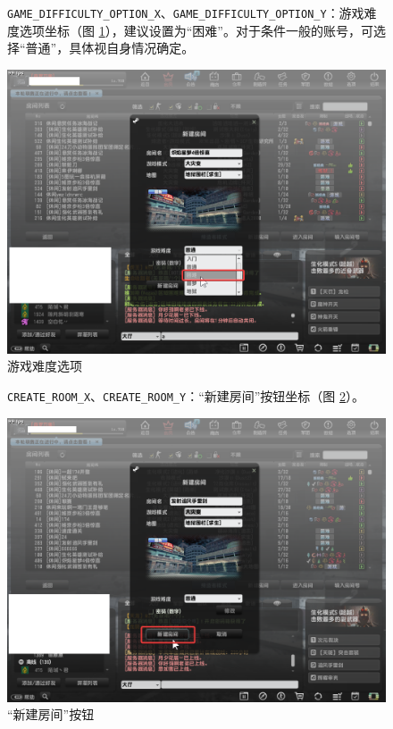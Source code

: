 \begin{figure}[H]
    \Centering
    \parbox[l]{\textwidth}{\lstinline{GAME_DIFFICULTY_OPTION_X}、\lstinline{GAME_DIFFICULTY_OPTION_Y}：游戏难度选项坐标（图 \ref{ch2fig-difficulty-option}），建议设置为“困难”。对于条件一般的账号，可选择“普通”，具体视自身情况确定。}
    \includegraphics[width=\textwidth]{docs/assets/difficulty_option.png}
    \caption{游戏难度选项}
    \label{ch2fig-difficulty-option}
\end{figure}


\begin{figure}[H]
    \Centering
    \parbox[l]{\textwidth}{\lstinline{CREATE_ROOM_X}、\lstinline{CREATE_ROOM_Y}：“新建房间”按钮坐标（图 \ref{ch2fig-create-room-1}）。}
    \includegraphics[width=\textwidth]{docs/assets/create_room_1.png}
    \caption{“新建房间”按钮}
    \label{ch2fig-create-room-1}
\end{figure}

